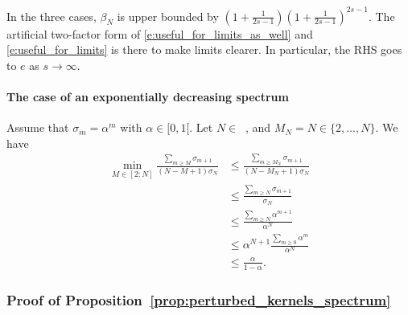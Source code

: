 \documentclass[twoside,11pt]{book}
\DeclareMathOperator{\Ns}{\mathbb{N}^{*}}
\begin{document}

In the three cases, $\beta_{N}$ is upper bounded by $\left(1+\frac{1}{2s-1}\right) \left(1+\frac{1}{2s-1}\right)^{2s-1}$. The artificial two-factor form of \eqref{e:useful_for_limits_as_well} and \eqref{e:useful_for_limits} is there to make limits clearer. In particular, the RHS goes to $e$ as $s\rightarrow \infty$.

\paragraph{The case of an exponentially decreasing spectrum}
Assume that $\sigma_{m} = \alpha^{m}$ with $\alpha \in [0,1[$.
Let $N \in \Ns$, and $M_N = N \in \{ 2,\dots, N\}$.
We have
\begin{align}
\min_{M \in [2:N]}\frac{\sum_{m \geq M} \sigma_{m+1}}{(N-M+1)\sigma_N}
& \leq \frac{\sum_{m \geq M_N} \sigma_{m+1}}{(N-M_N+1)\sigma_N}\\
& \leq \frac{\sum_{m \geq N} \sigma_{m+1}}{\sigma_N}\\
& \leq \frac{\sum_{m \geq N} \alpha^{m+1}}{\alpha^{N}}\\
& \leq \alpha^{N+1}\frac{\sum_{m \geq 0} \alpha^{m}}{\alpha^{N}}\\
& \leq \frac{\alpha}{1-\alpha}.
\end{align}

\subsubsection{Proof of Proposition~\ref{prop:perturbed_kernels_spectrum}}\label{app:proof_perturbed_kernels_spectrum}
\end{document}
